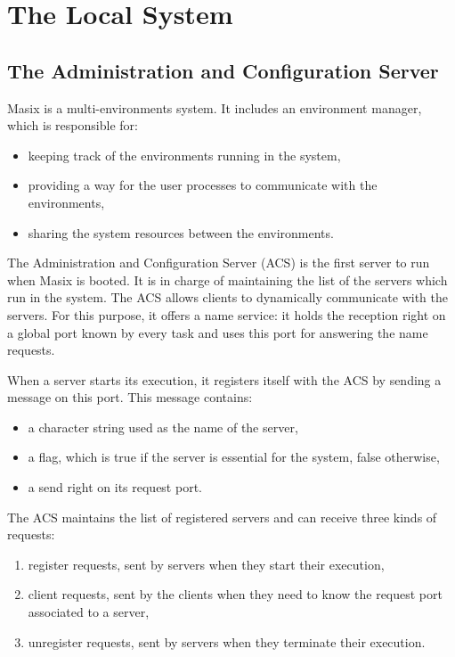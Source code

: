 \section {The Local System}

\subsection {The Administration and Configuration Server}

	Masix is a multi-environments system. It includes an environment
manager, which is responsible for:
\begin {itemize}
\item keeping track of the environments running in the system,
\item providing a way for the user processes to communicate with the
environments,
\item sharing the system resources between the environments.
\end {itemize}

	The Administration and Configuration Server (ACS) is the first server
to run when Masix is booted. It is in charge of maintaining the list of
the servers which run in the system. The ACS allows clients to dynamically
communicate with the servers. For this purpose, it offers a name service: it
holds the reception right on a global port known by every task and uses this
port for answering the name requests.

	When a server starts its execution, it registers itself with
the ACS by sending a message on this port. This message contains:
\begin {itemize}
\item a character string used as the name of the server,
\item a flag, which is true if the server is essential for the system, false
otherwise,
\item a send right on its request port.
\end {itemize}

	The ACS maintains the list of registered servers and can receive three
kinds of requests:
\begin {enumerate}
\item register requests, sent by servers when they start their execution,
\item client requests, sent by the clients when they need to know the request
port associated to a server,
\item unregister requests, sent by servers when they terminate their
execution.
\end {enumerate}

